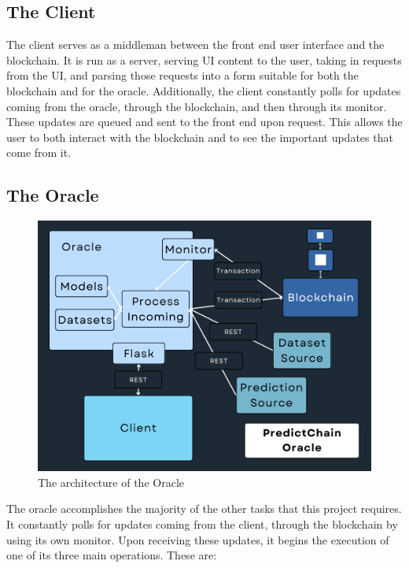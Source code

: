 \documentclass{ledger}
\begin{document}
\subsection{The Client}

The client serves as a middleman between the front end user interface and the blockchain.  It is run as a server,
serving UI content to the user, taking in requests from the UI, and parsing those requests into a form suitable for
both the blockchain and for the oracle.  Additionally, the client constantly polls for updates coming from the oracle,
through the blockchain, and then through its monitor.  These updates are queued and sent to the front end upon request.
This allows the user to both interact with the blockchain and to see the important updates that come from it.

\subsection{The Oracle}

\begin{figure}[H]
    \begin{center}
        \begin{minipage}{0.6\textwidth}
        \centering
        \includegraphics[width=\linewidth]{images/oracleDiagram}
        \caption{The architecture of the Oracle}\label{Fig:oracleDiagram}
    \end{minipage}\hfill
    \end{center}
\end{figure}

The oracle accomplishes the majority of the other tasks that this project requires.  It constantly polls for updates
coming from the client, through the blockchain by using its own monitor.  Upon receiving these updates, it begins
the execution of one of its three main operations.  These are:
\end{document}
